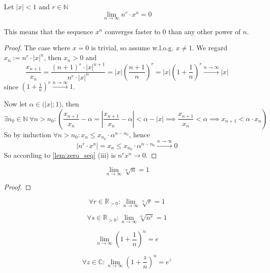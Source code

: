 \begin{proposition}
   Let \(|x| < 1\) and \(r \in \mathbb{N}\)
   \[\lim_{n \to \infty} n^r \cdot x^n = 0\]
\end{proposition}
\begin{remark}
   This means that the sequence \(x^n\) converges faster to 0 than any other power of \(n\).
\end{remark}
\begin{proof}
   The case where \(x = 0\) is trivial, so assume w.l.o.g. \(x \neq 1\).
   We regard \(x_n := n^r \cdot |x|^n\), then \(x_n > 0\) and
   \[\frac{x_{n+1}}{x_n} = \frac{(n+1)^r \cdot |x|^{n+1}}{n^r \cdot |x|^n} = |x| \left(\frac{n+1}{n}\right)^r = |x| \left(1 + \frac{1}{n}\right)^r \xrightarrow{n \to \infty} |x|\]
   since \(\left(1 + \frac{1}{n}\right)^r \xrightarrow{n \to \infty} 1\).

   Now let \(\alpha \in \big(|x|; 1\big)\), then
   \[\exists n_0 \in \mathbb{N}~\forall n > n_0: \left(\frac{x_{n+1}}{x_n} - \alpha = \left|\frac{x_{n+1}}{x_n} - \alpha\right| < \alpha - |x| \implies \frac{x_{n+1}}{x_n} < \alpha  \implies x_{n+1} < \alpha \cdot x_n\right)\]
   So by induction \(\forall n > n_0: x_n \leq x_{n_0} \cdot \alpha^{n - n_0}\), hence
   \[|n^r \cdot x^n| = x_n \leq x_{n_0} \cdot \alpha^{n-n_0} \xrightarrow{n \to \infty} 0\]
   So according to \cref{lem:zero_seq} (iii) is \(n^rx^n \to 0\).
\end{proof}

\begin{proposition}
   \[\lim_{n \to \infty} \sqrt[n]{n} = 1\]
\end{proposition}
\begin{proof}
\end{proof}

\begin{proposition}
   \[\forall r \in \mathbb{R}_{>0}: \lim_{n \to \infty} \sqrt[n]{r} = 1\]
\end{proposition}

\begin{proposition}
   \[\forall s \in \mathbb{R}_{>0}: \lim_{n \to \infty} \sqrt[n]{n^s} = 1\]
\end{proposition}

\begin{proposition}
   \[\lim_{n \to \infty} \left(1 + \frac{1}{n}\right)^n = e\]
\end{proposition}

\begin{proposition}
   \[\forall z \in \mathbb{C}: \lim_{n \to \infty} \left(1 + \frac{z}{n}\right)^n = e^z\]
\end{proposition}

